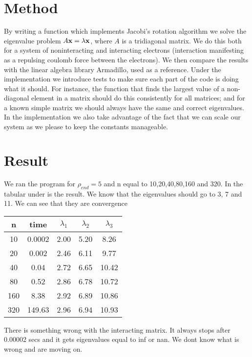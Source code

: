 \section{Method}
	By writing a function which implements Jacobi's rotation algorithm we solve the eigenvalue problem $A\vb{x} = \lambda \vb{x}$, where $A$ is a tridiagonal matrix. We do this both for a system of noninteracting and interacting electrons (interaction manifesting as a repulsing coulomb force between the electrons). We then compare the results with the linear algebra library Armadillo, used as a reference. Under the implementation we introduce tests to make sure each part of the code is doing what it should. For instance, the function that finds the largest value of a non-diagonal element in a matrix should do this consistently for all matrices; and for a known simple matrix we should always have the same and correct eigenvalues. In the implementation we also take advantage of the fact that we can scale our system as we please to keep the constants manageable.






\section{Result}

We ran the program for $\rho_{end} = 5$ and n equal to 10,20,40,80,160 and 320. In the tabular under is the result. We know that the eigenvalues should go to 3, 7 and 11. We can see that they are convergence 


\begin{tabular}{|c|c|c|c|c|}
	\hline 
	n & time & $\lambda_1$ & $\lambda_2$ & $\lambda_3$\\ 
	\hline
	10 & 0.0002 & 2.00 & 5.20 & 8.26 \\
	\hline
	20 & 0.002 & 2.46 & 6.11 & 9.77 \\
	\hline
	40 & 0.04 & 2.72 & 6.65 & 10.42 \\
	\hline
	80 & 0.52 & 2.86 & 6.78 & 10.72 \\
	\hline
	160 & 8.38 & 2.92 & 6.89 & 10.86 \\
	\hline
	320 & 149.63 & 2.96 & 6.94 & 10.93 \\
	\hline
\end{tabular}

There is something wrong with the interacting matrix. It always stops after 0.00002 secs and it gets eigenvalues equal to inf or nan. We dont know what is wrong and are moving on. 



